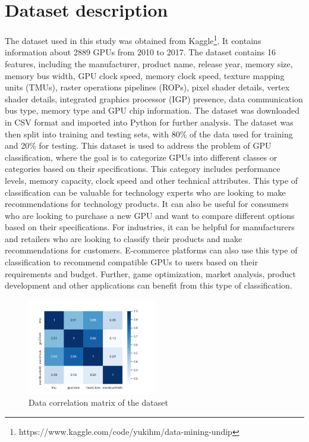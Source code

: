 \documentclass[conference,onecolumn]{IEEEtran}
\begin{document}
\section{Dataset description}
    The dataset used in this study was obtained from Kaggle\footnote{https://www.kaggle.com/code/yukihm/data-mining-undip}. It contains information about 2889 GPUs from 2010 to 2017. The dataset contains 16 features, including the manufacturer, product name, release year, memory size, memory bus width, GPU clock speed, memory clock speed, texture mapping units (TMUs), raster operations pipelines (ROPs), pixel shader details, vertex shader details, integrated graphics processor (IGP) presence, data communication bus type, memory type and GPU chip information. The dataset was downloaded in CSV format and imported into Python for further analysis. The dataset was then split into training and testing sets, with 80\% of the data used for training and 20\% for testing. 
    This dataset is used to address the problem of GPU classification, where the goal is to categorize GPUs into different classes or categories based on their specifications. This category includes performance levels, memory capacity, clock speed and other technical attributes. This type of classification can be valuable for technology experts who are looking to make recommendations for technology products. It can also be useful for consumers who are looking to purchase a new GPU and want to compare different options based on their specifications. For industries, it can be helpful for manufacturers and retailers who are looking to classify their products and make recommendations for customers. E-commerce platforms can also use this type of classification to recommend compatible GPUs to users based on their requirements and budget. Further, game optimization, market analysis, product development and other applications can benefit from this type of classification.

    \begin{figure}[H]
		\centering
		\includegraphics[width=0.5\textwidth]{Plots/DataCorelation.png}
		\caption{Data correlation matrix of the dataset}
		\label{fig:datacorrelationmatrix}
	\end{figure}
\end{document}
